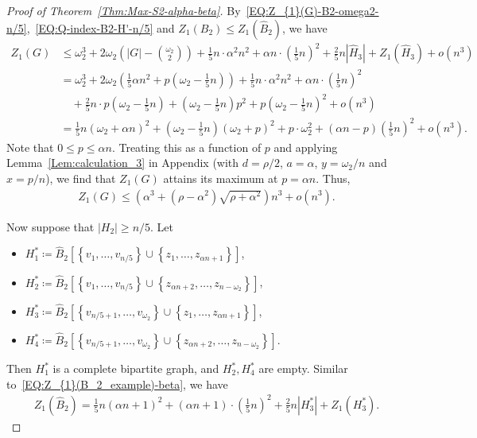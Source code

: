 \documentclass[11pt,a4paper]{article}
\begin{document}
\begin{proof}[Proof of Theorem~\ref{Thm:Max-S2-alpha-beta}]
By~\eqref{EQ:Z_{1}(G)-B2-omega2-n/5},~\eqref{EQ:Q-index-B2-H'-n/5} and $Z_{1}(B_2) \le Z_{1}(\hat{B}_2)$, we have 
\begin{align*}
Z_{1}(G)
&\le \omega_2^3 + 2\omega_2 \left(|G| - \binom{\omega_2}{2}\right) + \frac{1}{5}n \cdot \alpha^2 n^2 + \alpha n \cdot \left(\frac{1}{5}n\right)^2+ \frac{2}{5}n |\hat{H}_3|+Z_{1}(\hat{H}_3)+o(n^3)\\
&= \omega_2^3 + 2\omega_2 \left(\frac{1}{5} \alpha n^2 + p\left(\omega_2 - \frac{1}{5}n\right)\right) + \frac{1}{5}n \cdot \alpha^2 n^2 + \alpha n \cdot \left(\frac{1}{5}n\right)^2\\
& \quad + \frac{2}{5}n \cdot p\left(\omega_2 - \frac{1}{5}n\right)+\left(\omega_2-\frac{1}{5}n\right)p^2+p\left(\omega_2 - \frac{1}{5}n\right)^2+o(n^3)\\
&= \frac{1}{5}n (\omega_2 +\alpha n)^2 + \left(\omega_2 - \frac{1}{5}n\right) (\omega_2 + p)^2 + p \cdot \omega_2^2 + \left(\alpha n - p\right) \left(\frac{1}{5}n\right)^2 + o(n^3).
\end{align*}
Note that $0 \le p \le \alpha n$. 
Treating this as a function of $p$ and applying Lemma~\ref{Lem:calculation_3} in Appendix (with $d =\rho/2$, $a =\alpha$, $y =\omega_2/n$ and $x= p/n$), we find that $Z_{1}(G)$ attains its maximum at $p = \alpha n$. 
Thus, 
\begin{align*}
Z_{1}(G) 
\le \left(\alpha^3+(\rho-\alpha^2) \sqrt{\rho+\alpha^2}\right)n^3 + o(n^3).
\end{align*}


Now suppose that $|H_2| \ge n/5$. 
Let 
\begin{itemize}
\item $H_1^{\ast} \coloneqq \hat{B}_2\left[\left\{v_1,\ldots,v_{n/5}\right\} \cup \left\{z_1,\ldots,z_{\alpha n+1}\right\}\right]$, 

\item $H_2^{\ast} \coloneqq \hat{B}_2\left[\left\{v_1,\ldots,v_{n/5}\right\} \cup \left\{z_{\alpha n+2}, \ldots, z_{n-\omega_2}\right\}\right]$, 

\item $H_3^{\ast} \coloneqq \hat{B}_2\left[\left\{v_{n/5 +1}, \ldots, v_{\omega_2}\right\} \cup \left\{z_1, \ldots, z_{\alpha n+1}\right\}\right]$, 

\item $H_4^{\ast} \coloneqq \hat{B}_2\left[\left\{v_{n/5 +1}, \ldots, v_{\omega_2}\right\} \cup \left\{z_{\alpha n+2}, \ldots, z_{n-\omega_2}\right\}\right]$. 
\end{itemize}
Then $H_1^{\ast}$ is a complete bipartite graph, and $H_2^{\ast}, H_4^{\ast}$ are empty. 
Similar to~\eqref{EQ:Z_{1}(B_2_example)-beta}, we have 
\begin{align*}
Z_{1}(\hat{B}_2)
= \frac{1}{5}n (\alpha n+1)^2 + (\alpha n+1) \cdot \left(\frac{1}{5}n\right)^2+\frac{2}{5}n |H_3^{\ast}|+Z_{1}(H_3^{\ast}). 
\end{align*}


\end{proof}
\end{document}
